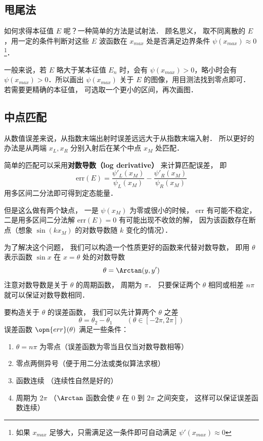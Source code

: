 \subsection{甩尾法}
如何求得本征值 $E$ 呢？一种简单的方法是试射法． 顾名思义， 取不同离散的 $E$，用一定的条件判断对这些 $E$ 波函数在 $x_{max}$ 处是否满足边界条件 $\psi(x_{max}) \approx 0$\footnote{如果 $x_{max}$ 足够大，只需满足这一条件即可自动满足 $\psi'(x_{max})\approx 0$}．

一般来说，若 $E$ 略大于某本征值 $E_n$ 时，会有 $\psi(x_{max})>0$，略小时会有 $\psi(x_{max})>0$．所以画出 $\psi(x_{max})$ 关于 $E$ 的图像，用目测法找到零点即可． 若需要更精确的本征值， 可选取一个更小的区间，再次画图．

\subsection{中点匹配}
从数值误差来说，从指数末端出射时误差远远大于从指数末端入射． 所以更好的办法是从两端 $x_L, x_R$ 分别入射后在某个中点 $x_M$ 处匹配．

简单的匹配可以采用\textbf{对数导数（log derivative）} 来计算匹配误差， 即
\begin{equation}
\text{err}(E) = \frac{\psi'_L(x_M)}{\psi_L(x_M)} - \frac{\psi'_R(x_M)}{\psi_R(x_M)}
\end{equation}
用多区间二分法即可得到定态能量．

但是这么做有两个缺点， 一是 $\psi(x_M)$ 为零或很小的时候， err 有可能不稳定， 二是用多区间二分法解 $\text{err}(E) = 0$ 有可能出现不收敛的解， 因为该函数存在断点（想象 $\sin(k x_M)$ 的对数导数随 $k$ 变化的情况）．

为了解决这个问题， 我们可以构造一个性质更好的函数来代替对数导数， 即用 $\theta$ 表示函数 $\sin x$ 在 $x = \theta$ 处的对数导数
\begin{equation}
\theta = \Arctan(y, y')
\end{equation}
注意对数导数是关于 $\theta$ 的周期函数， 周期为 $\pi$． 只要保证两个 $\theta$ 相同或相差 $n\pi$ 就可以保证对数导数相同．

要构造关于 $\theta$ 的误差函数， 我们可以先计算两个 $\theta$ 之差
\begin{equation}
\theta = \theta_2 - \theta_1 \qquad (\theta \in [-2\pi, 2\pi])
\end{equation}
误差函数 $\opn{err}(\theta)$ 满足一些条件：
\begin{enumerate}
\item $\theta = n\pi$ 为零点（误差函数为零当且仅当对数导数相等）
\item 零点两侧异号（便于用二分法或类似算法求根）
\item 函数连续 （连续性自然是好的）
\item 周期为 $2\pi$ （$\Arctan$ 函数会使 $\theta$ 在 0 到 $2\pi$ 之间突变， 这样可以保证误差函数连续）
\end{enumerate}

